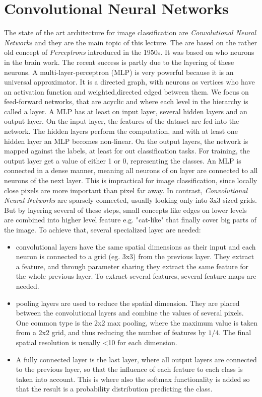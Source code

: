 \section{Convolutional Neural Networks}
The state of the art architecture for image classification are \emph{Convolutional Neural Networks} and they are the main topic of this lecture. The are based on the rather old concept of \emph{Perceptrons} introduced in the 1950s\cite{Rosenblatt1958}. It was based on who neurons in the brain work. The recent success is partly due to the layering of these neurons. A multi-layer-perceptron (MLP) is very powerful because it is an universal approximator.  It is a directed graph, with neurons as vertices who have an activation function and weighted,directed edged between them. We focus on feed-forward networks, that are acyclic and where each level in the hierarchy is called a layer. A MLP has at least on input layer, several hidden layers and an output layer. On the input layer, the features of the dataset are fed into the network. The hidden layers perform the computation, and with at least one hidden layer an MLP becomes non-linear. On the output layers, the network is mapped against the labels, at least for out classification tasks. For training, the output layer get a value of either 1 or 0, representing the classes. An MLP is connected in a dense manner, meaning all neurons of on layer are connected to all neurons of the next layer. This is impractical for image classification, since locally close pixels are more important than pixel far away. 
In contrast, \emph{Convolutional Neural Networks} are sparsely connected, usually looking only into 3x3 sized grids. But by layering several of these steps, small concepts like edges on lower levels are combined into higher level feature e.g. "cat-like" that finally cover big parts of the image. To achieve that, several specialized layer are needed:
\begin{itemize}
\item{convolutional layers} have the same spatial dimensions as their input and each neuron is connected to a grid (eg. 3x3) from the previous layer. They extract a feature, and through parameter sharing they extract the same feature for the whole previous layer. To extract several features, several feature maps are needed.  
\item{pooling layers} are used to reduce the spatial dimension. They are placed between the convolutional layers and combine the values of several pixels. One common type is the 2x2 max pooling, where the maximum value is taken from a 2x2 grid, and thus reducing the number of features by $1/4$. The final spatial resolution is usually <10 for each dimension. 
\item{A fully connected layer} is the last layer, where all output layers are connected to the previous layer, so that the influence of each feature to each class is taken into account. This is where also the softmax functionality is added so that the result is a probability distribution predicting the class. 
\end{itemize}



